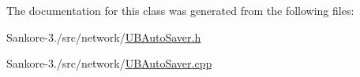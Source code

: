 The documentation for this class was generated from the following files\-:\begin{DoxyCompactItemize}
\item 
Sankore-\/3./src/network/\hyperlink{_u_b_auto_saver_8h}{U\-B\-Auto\-Saver.\-h}\item 
Sankore-\/3./src/network/\hyperlink{_u_b_auto_saver_8cpp}{U\-B\-Auto\-Saver.\-cpp}\end{DoxyCompactItemize}
